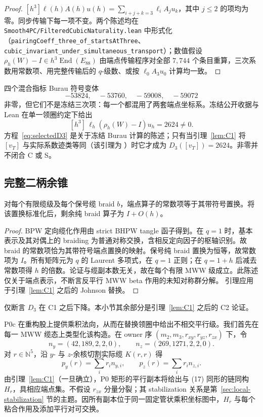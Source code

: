 \begin{proof}
$[h^3]\ell(h)A(h)u(h)=\sum_{i+j+k=3}\ell_iA_ju_k$，其中 $j\le2$ 的项均为零。同步传输下每一项不变。两个陈述均在 \texttt{Smooth4PC/FilteredCubicNaturality.lean} 中形式化（\texttt{pairingCoeff\_three\_of\_startsAtThree}、\texttt{cubic\_invariant\_under\_simultaneous\_transport}）；数值假设 $\rho_h(W)-I\in h^3\operatorname{End}(E_{88})$ 由端点传输程序对全部 $7{,}744$ 个条目重算，三次系数用常数项、用完整传输后的 $q$-级数、或按 $\ell_0A_3u_0$ 计算均一致。
\end{proof}

四个混合指标 Burau 符号变体
\[
-53824,\quad -53760,\quad -59008,\quad -59072
\]
非零，但它们不是冻结三次项：每一个都混用了两套端点坐标系。冻结公开收据与 Lean 在单一领圈约定下给出
\begin{equation}\label{eq:selectedD3}
[h^3]\,\ell_h(\rho_h(W)-I)u_h=2624\ne0.
\end{equation}
方程~\eqref{eq:selectedD3} 是关于冻结 Burau 计算的陈述；只有当引理~\ref{lem:C1} 将 $[v_T]$ 与实际系数迹类等同（该引理为 \Open）时它才成为 $D_3([v_T])=2624$。非零并不闭合 C 或 S。

\subsection{完整二柄余锥}

\begin{lemma}[全缆常数项]\label{lem:C2}
对每个有限缆级及每个保号缆 braid \(b\)，端点算子的常数项等于其带符号置换。将该置换标准化后，剩余纯 braid 算子为 \(I+O(h)\)。
\end{lemma}

\begin{proof}
BPW 定向缆化作用由 strict BHPW tangle 函子得到。在 \(q=1\) 时，基本表示及其对偶上的 braiding 为普通对称交换，含相反定向因子的枢轴识别。故 braid 的常数项恰为其带符号端点置换的映射。保号纯 braid 置换为恒等，故常数项为 \(I\)。所有矩阵元为 \(q\) 的 Laurent 多项式，在 \(q=1\) 正则；在 \(q=1+h\) 后减去常数项得 \(h\) 的倍数。论证与缆副本数无关，故在每个有限 MWW 级成立。此陈述仅关于端点表示，不断言反平行 MWW beta 作用的未知对称群分解。
引理应用于引理~\ref{lem:C1} 之后的 Johnson 替换。
\end{proof}

仅断言 $D_3$ 在 C1 之后下降。本小节其余部分是引理~\ref{lem:C1} 之后的 C2 论证。

P0c 在重构股上提供乘积法向，从而在替换领圈中给出不相交平行级。我们首先在每一 MWW 缆态上类型化该构造。在 owner 序 $(m_2,m_3,r_{xy},r_{yz},r_{zx})$ 下，令
\[
n_y=(42,189,2,2,0),\qquad n_z=(269,1271,2,2,0).
\]
对 $r\in\mathbb N^5$，沿 $y$- 与 $z$-余核切割实际缆 $K(r,r)$ 得
\[
p_y(r)=\sum_i r_i n_{y,i},\qquad
p_z(r)=\sum_i r_i n_{z,i}.
\tag{24}
\]
由引理~\ref{lem:C1}（一旦确立），P0 矩形的平行副本将给出与 (17) 同形的链同构 $H_r$，具相应端点集。不假设 $r_{zx}$ 分量分裂；其 stabilization 关系是第~\ref{sec:local-stabilization} 节的主题。因所有副本位于同一固定管状乘积坐标图中，$H_r$ 与每个粘合作用及添加平行对可交换。

